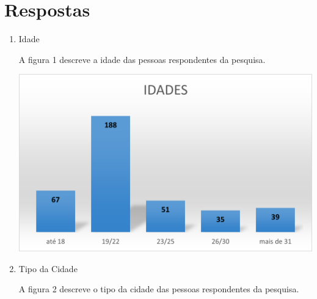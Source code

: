     \vspace{\baselineskip}
    \vspace{\baselineskip}
    
\section{Respostas}

\begin{enumerate}

    \item Idade

    A figura 1 descreve a idade das pessoas respondentes da pesquisa.

    \vspace{\baselineskip}
    \begin{center}
        \begin{minipage}{\textwidth}
            \includegraphics{figs/graph_idade.png}
            \label{fig:graph_idade}
        \end{minipage}        
    \end{center}



    \item Tipo da Cidade

    A figura 2 descreve o tipo da cidade das pessoas respondentes da pesquisa.


\end{enumerate}
